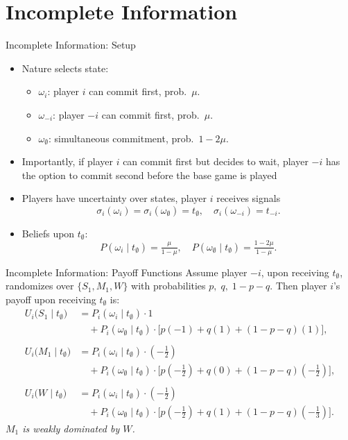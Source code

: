 \documentclass[../slides.tex]{subfiles}
\begin{document}
\section{Incomplete Information}
\begin{frame}{Incomplete Information: Setup}
\begin{itemize}
  \item Nature selects state:
    \begin{itemize}
      \item \(\omega_i\): player \(i\) can commit first, prob.\ \(\mu\).
      \item \(\omega_{-i}\): player \(-i\) can commit first, prob.\ \(\mu\).
      \item \(\omega_\emptyset\): simultaneous commitment, prob.\ \(1-2\mu\).
    \end{itemize}
  \item Importantly, if player $i$ can commit first but decides to wait, player $-i$ has the option to commit second before the base game is played \pause
  \item Players have uncertainty over states, player \(i\) receives signals
    \[
      \sigma_i(\omega_i)=\sigma_i(\omega_\emptyset)=t_\emptyset,\quad
      \sigma_i(\omega_{-i})=t_{-i}.
    \]
  \item Beliefs upon \(t_\emptyset\):
    \[
      P(\omega_i \mid t_\emptyset)=\tfrac{\mu}{1-\mu},\quad
      P(\omega_\emptyset \mid t_\emptyset)=\tfrac{1-2\mu}{1-\mu}.
    \]
\end{itemize}
\end{frame}
\begin{frame}{Incomplete Information: Payoff Functions}
Assume player \(-i\), upon receiving \(t_\emptyset\), randomizes over 
\(\{S_1, M_1, W\}\) with probabilities \(p,\;q,\;1-p-q\).  
Then player \(i\)’s payoff upon receiving \(t_\emptyset\) is:
\pause
\vspace{0.3ex}
\footnotesize
\begin{align*}
U_i\bigl(S_1 \mid t_\emptyset\bigr)
&= P_i(\omega_i\mid t_\emptyset)\cdot 1 \\
&\quad + P_i(\omega_\emptyset\mid t_\emptyset) \cdot \bigl[ p(-1) + q(1) + (1 - p - q)(1) \bigr], \\
\\
U_i\bigl(M_1 \mid t_\emptyset\bigr)
&= P_i(\omega_i\mid t_\emptyset)\cdot (-\tfrac{1}{2}) \\
&\quad + P_i(\omega_\emptyset\mid t_\emptyset) \cdot \bigl[ p(-\tfrac{1}{2}) + q(0) + (1 - p - q)(-\tfrac{1}{2}) \bigr], \\
\\
U_i\bigl(W \mid t_\emptyset\bigr)
&= P_i(\omega_i\mid t_\emptyset)\cdot (-\tfrac{1}{2}) \\
&\quad + P_i(\omega_\emptyset\mid t_\emptyset) \cdot \bigl[ p(-\tfrac{1}{2}) + q(1) + (1 - p - q)(-\tfrac{1}{3}) \bigr].
\end{align*}
\normalsize
\vspace{0.5ex}
\emph{\(M_1\) is weakly dominated by \(W\).}
\end{frame}
\end{document}
